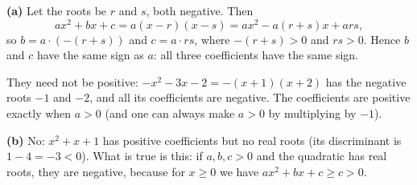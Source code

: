 \textbf{(a)} Let the roots be $r$ and $s$, both negative. Then
\[ax^2+bx+c=a(x-r)(x-s)=ax^2-a(r+s)x+ars ,\]
so $b=a\cdot(-(r+s))$ and $c=a\cdot rs$, where $-(r+s)>0$ and $rs>0$. Hence $b$ and $c$ have the same sign as $a$: all three coefficients have the same sign.

They need not be positive: $-x^2-3x-2=-(x+1)(x+2)$ has the negative roots $-1$ and $-2$, and all its coefficients are negative. The coefficients are positive exactly when $a>0$ (and one can always make $a>0$ by multiplying by $-1$).

\textbf{(b)} No: $x^2+x+1$ has positive coefficients but no real roots (its discriminant is $1-4=-3<0$). What is true is this: if $a,b,c>0$ and the quadratic has real roots, they are negative, because for $x\ge0$ we have $ax^2+bx+c\ge c>0$.

